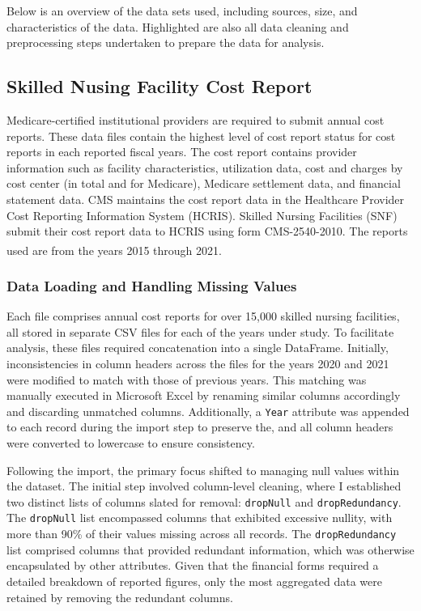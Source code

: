 \documentclass{article}
\theoremstyle{mytheoremstyle}
\theoremstyle{mytheoremstyle}
\theoremstyle{myproblemstyle}
\begin{document}
Below is an overview of the data sets used, including sources, size, and characteristics of the data. Highlighted are also all data cleaning and preprocessing steps undertaken to prepare the data for analysis.



\subsection{Skilled Nusing Facility Cost Report}

Medicare-certified institutional providers are required to submit annual cost reports. These data files contain the highest level of cost report status for cost reports in each reported fiscal years. The cost report contains provider information such as facility characteristics, utilization data, cost and charges by cost center (in total and for Medicare), Medicare settlement data, and financial statement data. CMS maintains the cost report data in the Healthcare Provider Cost Reporting Information System (HCRIS). Skilled Nursing Facilities (SNF) submit their cost report data to HCRIS using form CMS-2540-2010. The reports used are from the years 2015 through 2021.\textsuperscript{\cite{cms2023}}

\subsubsection{Data Loading and Handling Missing Values}

Each file comprises annual cost reports for over 15,000 skilled nursing facilities, all stored in separate CSV files for each of the years under study. To facilitate analysis, these files required concatenation into a single DataFrame. Initially, inconsistencies in column headers across the files for the years 2020 and 2021 were modified to match with those of previous years. This matching was manually executed in Microsoft Excel by renaming similar columns accordingly and discarding unmatched columns. Additionally, a \texttt{Year} attribute was appended to each record during the import step to preserve the, and all column headers were converted to lowercase to ensure consistency.

Following the import, the primary focus shifted to managing null values within the dataset. The initial step involved column-level cleaning, where I established two distinct lists of columns slated for removal: \texttt{dropNull} and \texttt{dropRedundancy}. The \texttt{dropNull} list encompassed columns that exhibited excessive nullity, with more than 90\% of their values missing across all records. The \texttt{dropRedundancy} list comprised columns that provided redundant information, which was otherwise encapsulated by other attributes. Given that the financial forms required a detailed breakdown of reported figures, only the most aggregated data were retained by removing the redundant columns.
\end{document}
